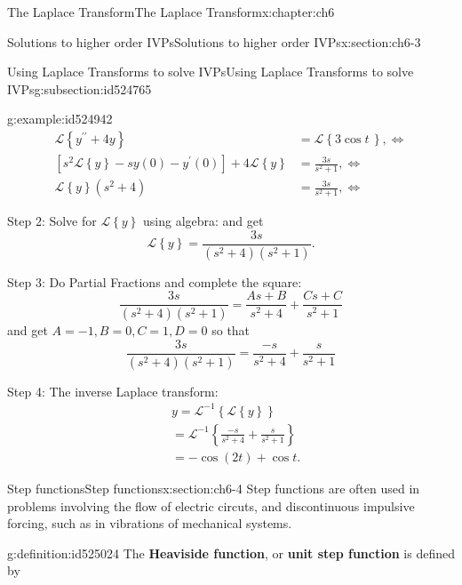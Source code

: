 \documentclass[oneside,10pt,]{book}
\newcommand{\terminology}[1]{\textbf{#1}}
\numberwithin{equation}{section}
\numberwithin{equation}{section}
\newcommand{\amp}{&}
\begin{document}
\begin{chapterptx}{The Laplace Transform}{}{The Laplace Transform}{}{}{x:chapter:ch6}
\begin{sectionptx}{Solutions to higher order IVPs}{}{Solutions to higher order IVPs}{}{}{x:section:ch6-3}
\begin{subsectionptx}{Using Laplace Transforms to solve IVPs}{}{Using Laplace Transforms to solve IVPs}{}{}{g:subsection:id524765}
\begin{example}{}{g:example:id524942}
\begin{align*}
\mathcal{L}\left\{ y^{\prime\prime}+4y\right\}  \amp =\mathcal{L}\left\{ 3\cos t\,\right\} ,\iff\\
\left[s^{2}\mathcal{L}\left\{ y\right\} -sy(0)-y^{\prime}(0)\right]+4\mathcal{L}\left\{ y\right\}  \amp =\frac{3s}{s^{2}+1},\iff\\
\mathcal{L}\left\{ y\right\} \left(s^{2}+4\right) \amp =\frac{3s}{s^{2}+1},\iff
\end{align*}
%
\par
Step 2: Solve for \(\mathcal{L}\left\{ y\right\} \) using algebra: and get%
\begin{equation*}
\mathcal{L}\left\{ y\right\} =\frac{3s}{\left(s^{2}+4\right)\left(s^{2}+1\right)}.
\end{equation*}
%
\par
Step 3: Do Partial Fractions and complete the square:%
\begin{equation*}
\frac{3s}{\left(s^{2}+4\right)\left(s^{2}+1\right)}=\frac{As+B}{s^{2}+4}+\frac{Cs+C}{s^{2}+1}
\end{equation*}
and get \(A=-1,B=0,C=1,D=0\) so that%
\begin{equation*}
\frac{3s}{\left(s^{2}+4\right)\left(s^{2}+1\right)}=\frac{-s}{s^{2}+4}+\frac{s}{s^{2}+1}
\end{equation*}
%
\par
Step 4: The inverse Laplace transform:%
\begin{align*}
\amp y=\mathcal{L}^{-1}\left\{ \mathcal{L}\left\{ y\right\} \right\} \\
\amp =\mathcal{L}^{-1}\left\{ \frac{-s}{s^{2}+4}+\frac{s}{s^{2}+1}\right\} \\
\amp =-\cos(2t)+\cos t.
\end{align*}
%
\end{example}
\end{subsectionptx}
\end{sectionptx}
%
%
\typeout{************************************************}
\typeout{************************************************}
%
\begin{sectionptx}{Step functions}{}{Step functions}{}{}{x:section:ch6-4}
Step functions are often used in problems involving the flow of electric circuts, and discontinuous impulsive forcing, such as in vibrations of mechanical systems.%
\begin{definition}{}{g:definition:id525024}%
The \terminology{Heaviside function}, or \terminology{unit step function} is defined by%

\end{definition}
\end{sectionptx}
\end{chapterptx}
\end{document}
